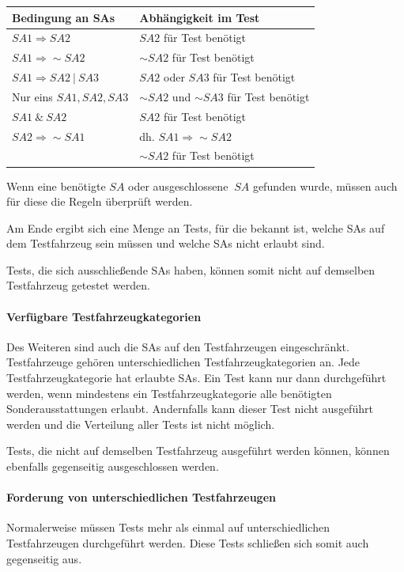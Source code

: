 \begin{table}[H]
    \label{tab:tableSAs}
    \begin{tabularx}{\textwidth}{ | l | X |}
        Bedingung an SAs & Abhängigkeit im Test \\\hline\hline
        $SA1 \Rightarrow SA2$ & $SA2$ für Test benötigt \\\hline
        $SA1 \Rightarrow \sim SA2$ & $\sim SA2$  für Test benötigt \\\hline
        $SA1 \Rightarrow SA2~|~SA3$ & $SA2$ oder $SA3$  für Test benötigt \\\hline
        Nur eins $SA1, SA2, SA3$ & $\sim SA2$ und $\sim SA3$  für Test benötigt \\\hline
        $SA1~\&~SA2$ & $SA2$  für Test benötigt \\\hline
        $SA2 \Rightarrow \sim SA1$ & dh. $SA1 \Rightarrow \sim SA2$ \\& $\sim SA2$  für Test benötigt\\\hline
    \end{tabularx}
\end{table}
Wenn eine benötigte $SA$ oder ausgeschlossene $~SA$ gefunden wurde,
müssen auch für diese die Regeln überprüft werden.

Am Ende ergibt sich eine Menge an Tests, für die bekannt ist,
welche SAs auf dem Testfahrzeug sein müssen und welche SAs nicht erlaubt sind.

Tests, die sich ausschließende SAs haben, können somit nicht auf demselben
Testfahrzeug getestet werden.

\paragraph{Verfügbare Testfahrzeugkategorien}
Des Weiteren sind auch die SAs auf den Testfahrzeugen eingeschränkt.
Testfahrzeuge gehören unterschiedlichen Testfahrzeugkategorien an.
Jede Testfahrzeugkategorie hat erlaubte SAs.
Ein Test kann nur dann durchgeführt werden, wenn mindestens ein Testfahrzeugkategorie
alle benötigten Sonderausstattungen erlaubt. Andernfalls kann dieser Test nicht
ausgeführt werden und die Verteilung aller Tests ist nicht möglich.

Tests, die nicht auf demselben Testfahrzeug ausgeführt werden können,
können ebenfalls gegenseitig ausgeschlossen werden.

\paragraph{Forderung von unterschiedlichen Testfahrzeugen}
Normalerweise müssen Tests mehr als einmal auf unterschiedlichen Testfahrzeugen
durchgeführt werden. Diese Tests schließen sich somit auch gegenseitig aus.

